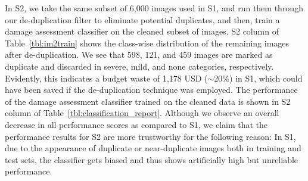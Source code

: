 \documentclass{iscram}
\begin{document}
In S2, we take the same subset of 6,000 images used in S1, and run them through our de-duplication filter to eliminate potential duplicates, and then, train a damage assessment classifier on the cleaned subset of images. S2 column of Table~\ref{tbl:im2train} shows the class-wise distribution of the remaining images after de-duplication. We see that 598, 121, and 459 images are marked as duplicate and discarded in severe, mild, and none categories, respectively. Evidently, this indicates a budget waste of 1,178 USD ($\sim$20\%) in S1, which could have been saved if the de-duplication technique was employed.
The performance of the damage assessment classifier trained on the cleaned data is shown in S2 column of Table~\ref{tbl:classification_report}. Although we observe an overall decrease in all performance scores as compared to S1, we claim that the performance results for S2 are more trustworthy for the following reason: In S1, due to the appearance of duplicate or near-duplicate images both in training and test sets, the classifier gets biased and thus shows artificially high but unreliable performance.
\end{document}
